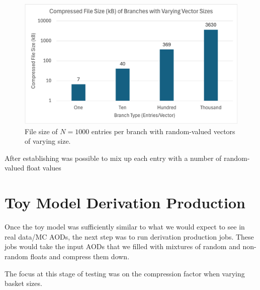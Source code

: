 \begin{figure}[h]\label{fig:toymodel_filesize_rndm_vectors}
    \caption{File size of $N=1000$ entries per branch with random-valued vectors of varying size.}
    \centering
    \includegraphics[width=.8\textwidth]{content/toymodel_content/branch_fileSize_nomix.png}
\end{figure}

After establishing  was possible to mix up each entry with a number of random-valued float values 

\section{Toy Model Derivation Production}

Once the toy model was sufficiently similar to what we would expect to see in real data/MC AODs, the next step was to run derivation production jobs. 
These jobs would take the input AODs that we filled with mixtures of random and non-random floats and compress them down. 

The focus at this stage of testing was on the compression factor when varying basket sizes. 